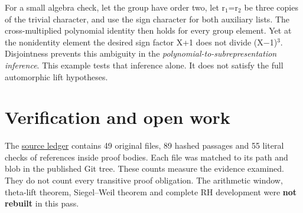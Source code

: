 \documentclass[11pt,letterpaper]{article}
\begin{document}
For a small algebra check, let the group have order two, let r\ensuremath{{}_{1}}=r\ensuremath{{}_{2}} be three copies of the trivial character, and use the sign character for both auxiliary lists. The cross-multiplied polynomial identity then holds for every group element. Yet at the nonidentity element the desired sign factor X+1 does not divide (X\ensuremath{-}1)\ensuremath{{}^{3}}. Disjointness prevents this ambiguity in the \emph{polynomial-to-subrepresentation inference}. This example tests that inference alone. It does not satisfy the full automorphic lift hypotheses.

\section{Verification and open work}
The \href{https://github.com/nousentllc/riemann-hypothesis/blob/003f8090b9894fb955d0925ea1b7f7da64a823c3/research/uriel/experiments/stable-range-theta/source_trace.json}{source ledger} contains 49 original files, 89 hashed passages and 55 literal checks of references inside proof bodies. Each file was matched to its path and blob in the published Git tree. These counts measure the evidence examined. They do not count every transitive proof obligation. The arithmetic window, theta-lift theorem, Siegel–Weil theorem and complete RH development were \textbf{not rebuilt} in this pass.
\end{document}

